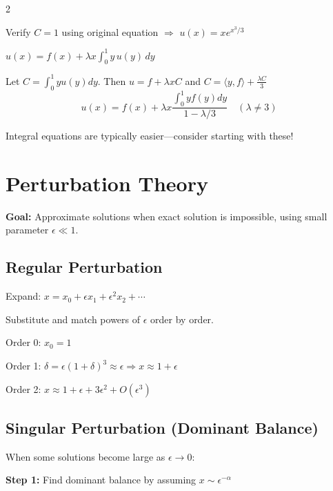 \documentclass[10pt,a4paper]{article}
\begin{document}
\begin{multicols}{2}
\begin{example}
Verify $C=1$ using original equation $\Rightarrow$ $u(x) = xe^{x^3/3}$
\end{example}

\begin{example}
$\displaystyle u(x) = f(x) + \lambda x\int_0^1 y\,u(y)\,dy$

Let $C = \int_0^1 y u(y)dy$. Then $u = f + \lambda x C$ and
$C = \langle y, f\rangle + \frac{\lambda C}{3}$
\begin{equation}
u(x) = f(x) + \lambda x\frac{\int_0^1 y f(y)dy}{1 - \lambda/3}\quad (\lambda \neq 3)
\end{equation}
\end{example}

\begin{warning}
Integral equations are typically easier—consider starting with these!
\end{warning}

\section{Perturbation Theory}

\textbf{Goal:} Approximate solutions when exact solution is impossible, using small parameter $\epsilon \ll 1$.

\subsection{Regular Perturbation}
Expand: $x = x_0 + \epsilon x_1 + \epsilon^2 x_2 + \cdots$

Substitute and match powers of $\epsilon$ order by order.

\begin{example}[$x - 1 = \epsilon x^3$, root near $x=1$]
Order 0: $x_0 = 1$

Order 1: $\delta = \epsilon(1+\delta)^3 \approx \epsilon \Rightarrow x \approx 1 + \epsilon$

Order 2: $x \approx 1 + \epsilon + 3\epsilon^2 + O(\epsilon^3)$
\end{example}

\subsection{Singular Perturbation (Dominant Balance)}
When some solutions become large as $\epsilon\to 0$:

\textbf{Step 1:} Find dominant balance by assuming $x \sim \epsilon^{-\alpha}$


\end{multicols}
\end{document}
